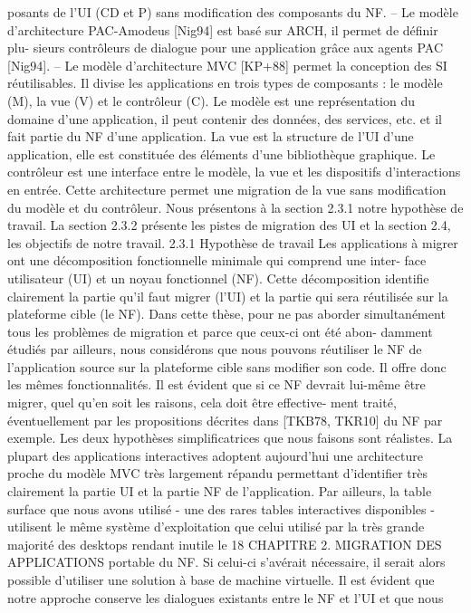 \documentclass{article}
\begin{document}
posants de l’UI (CD et P) sans modiﬁcation des composants du NF.
– Le modèle d’architecture PAC-Amodeus [Nig94] est basé sur ARCH, il permet de déﬁnir plu-
sieurs contrôleurs de dialogue pour une application grâce aux agents PAC [Nig94].
– Le modèle d’architecture MVC [KP+88] permet la conception des SI réutilisables. Il divise
les applications en trois types de composants : le modèle (M), la vue (V) et le contrôleur (C).
Le modèle est une représentation du domaine d’une application, il peut contenir des données,
des services, etc. et il fait partie du NF d’une application. La vue est la structure de l’UI d’une
application, elle est constituée des éléments d’une bibliothèque graphique. Le contrôleur est
une interface entre le modèle, la vue et les dispositifs d’interactions en entrée. Cette architecture
permet une migration de la vue sans modiﬁcation du modèle et du contrôleur.
Nous présentons à la section 2.3.1 notre hypothèse de travail. La section 2.3.2 présente les pistes
de migration des UI et la section 2.4, les objectifs de notre travail.
2.3.1
Hypothèse de travail
Les applications à migrer ont une décomposition fonctionnelle minimale qui comprend une inter-
face utilisateur (UI) et un noyau fonctionnel (NF). Cette décomposition identiﬁe clairement la partie
qu’il faut migrer (l’UI) et la partie qui sera réutilisée sur la plateforme cible (le NF). Dans cette thèse,
pour ne pas aborder simultanément tous les problèmes de migration et parce que ceux-ci ont été abon-
damment étudiés par ailleurs, nous considérons que nous pouvons réutiliser le NF de l’application
source sur la plateforme cible sans modiﬁer son code. Il offre donc les mêmes fonctionnalités. Il est
évident que si ce NF devrait lui-même être migrer, quel qu’en soit les raisons, cela doit être effective-
ment traité, éventuellement par les propositions décrites dans [TKB78, TKR10] du NF par exemple.
Les deux hypothèses simpliﬁcatrices que nous faisons sont réalistes. La plupart des applications
interactives adoptent aujourd’hui une architecture proche du modèle MVC très largement répandu
permettant d’identiﬁer très clairement la partie UI et la partie NF de l’application. Par ailleurs, la
table surface que nous avons utilisé - une des rares tables interactives disponibles - utilisent le même
système d’exploitation que celui utilisé par la très grande majorité des desktops rendant inutile le
18
CHAPITRE 2. MIGRATION DES APPLICATIONS
portable du NF. Si celui-ci s’avérait nécessaire, il serait alors possible d’utiliser une solution à base de
machine virtuelle.
Il est évident que notre approche conserve les dialogues existants entre le NF et l’UI et que nous
\end{document}

